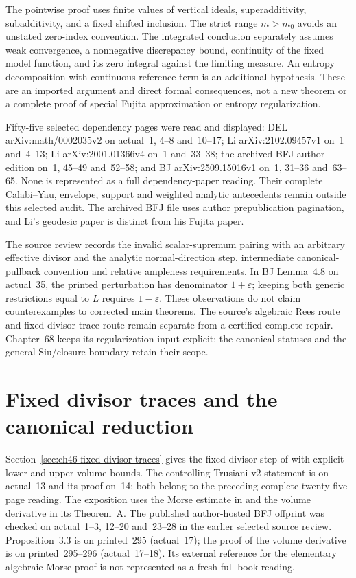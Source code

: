 The pointwise proof uses finite values of vertical ideals,
superadditivity, subadditivity, and a fixed shifted inclusion.
The strict range $m>m_0$ avoids an unstated zero-index convention.
The integrated conclusion separately assumes weak convergence,
a nonnegative discrepancy bound, continuity of the fixed model
function, and its zero integral against the limiting measure.
An entropy decomposition with continuous reference term is an
additional hypothesis. These are an imported argument and direct
formal consequences, not a new theorem or a complete proof of
special Fujita approximation or entropy regularization.

Fifty-five selected dependency pages were read and displayed:
DEL arXiv:\allowbreak math/0002035v2 on actual~1, 4--8 and~10--17;
Li arXiv:\allowbreak 2102.09457v1 on~1 and~4--13;
Li arXiv:\allowbreak 2001.01366v4 on~1 and~33--38;
the archived BFJ author edition on~1, 45--49 and~52--58;
and BJ arXiv:\allowbreak 2509.15016v1 on~1, 31--36 and~63--65.
None is represented as a full dependency-paper reading.
Their complete Calabi--Yau, envelope, support and weighted analytic
antecedents remain outside this selected audit. The archived BFJ
file uses author prepublication pagination, and Li's geodesic paper
is distinct from his Fujita paper.

The source review records the invalid scalar-supremum pairing with
an arbitrary effective divisor and the analytic normal-direction
step, intermediate canonical-pullback convention and relative
ampleness requirements. In BJ Lemma~4.8 on actual~35, the printed
perturbation has denominator $1+\varepsilon$; keeping both generic
restrictions equal to $L$ requires $1-\varepsilon$. These observations
do not claim counterexamples to corrected main theorems. The source's
algebraic Rees route and fixed-divisor trace route remain separate
from a certified complete repair. Chapter~68 keeps its regularization
input explicit; the canonical statuses and the general Siu/closure
boundary retain their scope.

\section{Fixed divisor traces and the canonical reduction}
\label{sec:provenance-fixed-divisor-traces}

Section~\ref{sec:ch46-fixed-divisor-traces} gives the fixed-divisor
step of \cite[Lemma~4.3]{Trusiani26} with explicit lower and upper
volume bounds. The controlling Trusiani v2 statement is on
actual~13 and its proof on~14; both belong to the preceding complete
twenty-five-page reading. The exposition uses the Morse estimate
in \cite[Proposition~3.3]{BFJ09} and the volume derivative in its
Theorem~A. The published author-hosted BFJ offprint was checked
on actual~1--3, 12--20 and~23--28 in the earlier selected source
review. Proposition~3.3 is on printed~295 (actual~17); the proof
of the volume derivative is on printed~295--296 (actual~17--18).
Its external reference for the elementary algebraic Morse proof
is not represented as a fresh full book reading.

